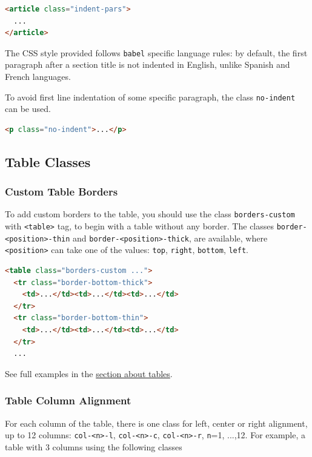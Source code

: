 \documentclass[
  11pt,
  a4paper,
]{article}
\begin{document}
\begin{lstlisting}[language=HTML]
<article class="indent-pars">
  ...
</article>
\end{lstlisting}

The CSS style provided follows \lstinline!babel! specific
language rules: by default, the first paragraph after a section title is
not indented in English, unlike Spanish and French languages.

To avoid first line indentation of some specific paragraph, the class
\lstinline!no-indent! can be used.

\begin{lstlisting}[language=HTML]
<p class="no-indent">...</p>
\end{lstlisting}

\subsection{Table Classes}\label{table-classes}

\subsubsection{Custom Table Borders}\label{table-borders}

To add custom borders to the table, you should use the class
\lstinline!borders-custom! with
\lstinline!<table>! tag, to begin with a table without any
border. The classes \lstinline!border-<position>-thin! and
\lstinline!border-<position>-thick!, are available, where
\lstinline!<position>! can take one of the values:
\lstinline!top!, \lstinline!right!,
\lstinline!bottom!, \lstinline!left!.

\begin{lstlisting}[language=HTML]
<table class="borders-custom ...">
  <tr class="border-bottom-thick">
    <td>...</td><td>...</td><td>...</td>
  </tr>
  <tr class="border-bottom-thin">
    <td>...</td><td>...</td><td>...</td>
  </tr>
  ...
\end{lstlisting}

See full examples in the \hyperref[tables]{section about tables}.

\subsubsection{Table Column Alignment}\label{table-column-aligment}

For each column of the table, there is one class for left, center or
right alignment, up to 12 columns: \lstinline!col-<n>-l!,
\lstinline!col-<n>-c!,
\lstinline!col-<n>-r!, \lstinline!n!=1,
...,12. For example, a table with 3 columns using the following classes
\end{document}
